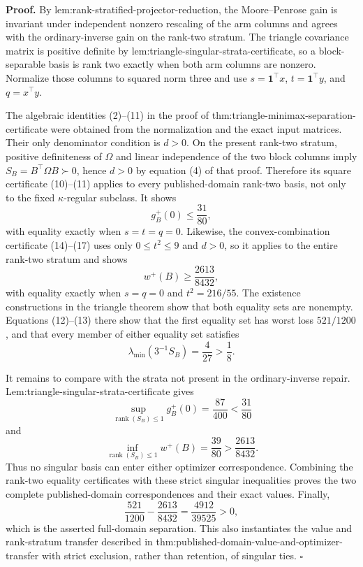 \textbf{Proof.}
By lem:rank-stratified-projector-reduction, the Moore--Penrose gain is invariant under independent nonzero rescaling of the arm columns and agrees with the ordinary-inverse gain on the rank-two stratum.  The triangle covariance matrix is positive definite by lem:triangle-singular-strata-certificate, so a block-separable basis is rank two exactly when both arm columns are nonzero.  Normalize those columns to squared norm three and use \(s=\mathbf1^{\top}x\), \(t=\mathbf1^{\top}y\), and \(q=x^{\top}y\).

The algebraic identities (2)--(11) in the proof of thm:triangle-minimax-separation-certificate were obtained from the normalization and the exact input matrices.  Their only denominator condition is \(d>0\).  On the present rank-two stratum, positive definiteness of \(\Omega\) and linear independence of the two block columns imply \(S_B=B^{\top}\Omega B\succ0\), hence \(d>0\) by equation (4) of that proof.  Therefore its square certificate (10)--(11) applies to every published-domain rank-two basis, not only to the fixed \(\kappa\)-regular subclass.  It shows
\[
 g_B^{+}(0)\le\frac{31}{80},
\]
with equality exactly when \(s=t=q=0\).  Likewise, the convex-combination certificate (14)--(17) uses only \(0\le t^2\le9\) and \(d>0\), so it applies to the entire rank-two stratum and shows
\[
 w^{+}(B)\ge\frac{2613}{8432},
\]
with equality exactly when \(s=q=0\) and \(t^2=216/55\).  The existence constructions in the triangle theorem show that both equality sets are nonempty.  Equations (12)--(13) there show that the first equality set has worst loss \(521/1200\), and that every member of either equality set satisfies
\[
 \lambda_{\min}(3^{-1}S_B)=\frac4{27}>\frac18.
\]

It remains to compare with the strata not present in the ordinary-inverse repair.  Lem:triangle-singular-strata-certificate gives
\[
 \sup_{\operatorname{rank}(S_B)\le1}g_B^{+}(0)
 =\frac{87}{400}<\frac{31}{80}
\]
and
\[
 \inf_{\operatorname{rank}(S_B)\le1}w^{+}(B)
 =\frac{39}{80}>\frac{2613}{8432}.
\]
Thus no singular basis can enter either optimizer correspondence.  Combining the rank-two equality certificates with these strict singular inequalities proves the two complete published-domain correspondences and their exact values.  Finally,
\[
 \frac{521}{1200}-\frac{2613}{8432}
 =\frac{4912}{39525}>0,
\]
which is the asserted full-domain separation.  This also instantiates the value and rank-stratum transfer described in thm:published-domain-value-and-optimizer-transfer with strict exclusion, rather than retention, of singular ties. \(\square\)